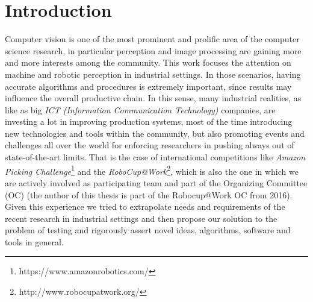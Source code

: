 \chapter{Introduction}\label{ch:intro}
Computer vision is one of the most prominent and prolific area of the computer science research, in particular perception and image processing are gaining more and more interests among the community. This work focuses the attention on machine and robotic perception in industrial settings. In those scenarios, having accurate algorithms and procedures is extremely important, since results may influence the overall productive chain. In this sense, many industrial realities, as like as big \emph{ICT (Information Communication Technology)} companies, are investing a lot in improving production systems, most of the time introducing new technologies and tools within the community, but also promoting events and challenges all over the world for enforcing researchers in pushing always out of state-of-the-art limits. That is the case of international competitions like \emph{Amazon Picking Challenge}\footnote{https://www.amazonrobotics.com/} and the \emph{RoboCup@Work}\footnote{http://www.robocupatwork.org/}, which is also the one in which we are actively involved as participating team and part of the Organizing Committee (OC) (the author of this thesis is part of the Robocup@Work OC from 2016). Given this experience we tried to extrapolate needs and requirements of the recent research in industrial settings and then propose our solution to the problem of testing and rigorously assert novel ideas, algorithms, software and tools in general.

